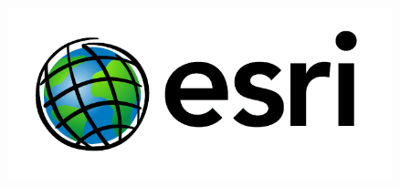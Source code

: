 \documentclass[22pt]{beamer}
\begin{document}
\begin{frame}[fragile]
\begin{textblock}{7.25}
\begin{figure}[htbp]
\hspace{1cm}
\includegraphics[height=5cm]{esri-logo.png}
\end{figure}
\end{textblock}


\end{frame}
\end{document}
